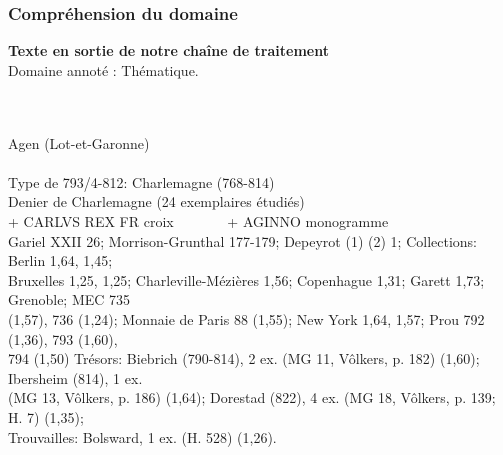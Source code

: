 \documentclass[10pt, compress]{beamer}
\begin{document}
\begin{frame}[fragile]
	\frametitle{Compréhension du domaine}

	\textbf{Texte en sortie de notre chaîne de traitement}\\
	Domaine annoté : \colorbox{blue!30}{Thématique}.\\~\\~\\
\begin{scriptsize}
\colorbox{blue!30}{Agen (Lot-et-Garonne)}\\~\\

\colorbox{blue!30}{Type de 793/4-812}: Charlemagne (768-814)\\
\colorbox{blue!30}{Denier de Charlemagne} (24 exemplaires étudiés)\\
\colorbox{blue!30}{+ CARLVS REX FR croix~~~~~~~ + AGINNO monogramme}\\
Gariel XXII 26; Morrison-Grunthal 177-179; Depeyrot (1) (2) 1; Collections: \colorbox{blue!30}{Berlin 1,64, 1,45;}\\
\colorbox{blue!30}{Bruxelles 1,25, 1,25; Charleville-Mézières 1,56; Copenhague 1,31; Garett 1,73; Grenoble; MEC 735} \\
\colorbox{blue!30}{(1,57), 736 (1,24); Monnaie de Paris 88 (1,55); New York 1,64, 1,57; Prou 792 (1,36), 793 (1,60),} \\
\colorbox{blue!30}{794 (1,50)} Trésors: \colorbox{blue!30}{Biebrich (790-814), 2 ex. (MG 11, Vôlkers, p. 182) (1,60); Ibersheim (814), 1 ex.} \\
\colorbox{blue!30}{(MG 13, Vôlkers, p. 186) (1,64); Dorestad (822), 4 ex. (MG 18, Vôlkers, p. 139; H. 7) (1,35);}\\
Trouvailles: \colorbox{blue!30}{Bolsward, 1 ex. (H. 528) (1,26).}
\end{scriptsize}
\end{frame}


\end{document}
